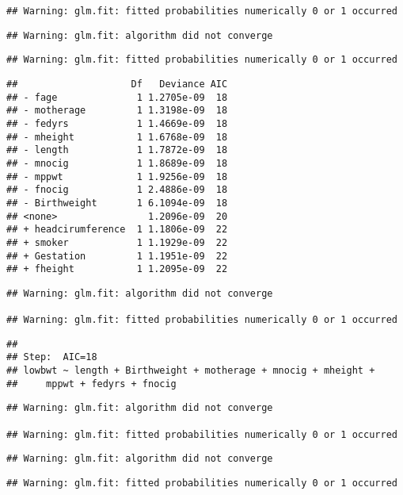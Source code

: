 \documentclass[]{article}
\begin{document}
\begin{verbatim}
## Warning: glm.fit: fitted probabilities numerically 0 or 1 occurred
\end{verbatim}

\begin{verbatim}
## Warning: glm.fit: algorithm did not converge
\end{verbatim}

\begin{verbatim}
## Warning: glm.fit: fitted probabilities numerically 0 or 1 occurred
\end{verbatim}

\begin{verbatim}
##                    Df   Deviance AIC
## - fage              1 1.2705e-09  18
## - motherage         1 1.3198e-09  18
## - fedyrs            1 1.4669e-09  18
## - mheight           1 1.6768e-09  18
## - length            1 1.7872e-09  18
## - mnocig            1 1.8689e-09  18
## - mppwt             1 1.9256e-09  18
## - fnocig            1 2.4886e-09  18
## - Birthweight       1 6.1094e-09  18
## <none>                1.2096e-09  20
## + headcirumference  1 1.1806e-09  22
## + smoker            1 1.1929e-09  22
## + Gestation         1 1.1951e-09  22
## + fheight           1 1.2095e-09  22
\end{verbatim}

\begin{verbatim}
## Warning: glm.fit: algorithm did not converge

## Warning: glm.fit: fitted probabilities numerically 0 or 1 occurred
\end{verbatim}

\begin{verbatim}
## 
## Step:  AIC=18
## lowbwt ~ length + Birthweight + motherage + mnocig + mheight + 
##     mppwt + fedyrs + fnocig
\end{verbatim}

\begin{verbatim}
## Warning: glm.fit: algorithm did not converge

## Warning: glm.fit: fitted probabilities numerically 0 or 1 occurred
\end{verbatim}

\begin{verbatim}
## Warning: glm.fit: algorithm did not converge
\end{verbatim}

\begin{verbatim}
## Warning: glm.fit: fitted probabilities numerically 0 or 1 occurred
\end{verbatim}
\end{document}
